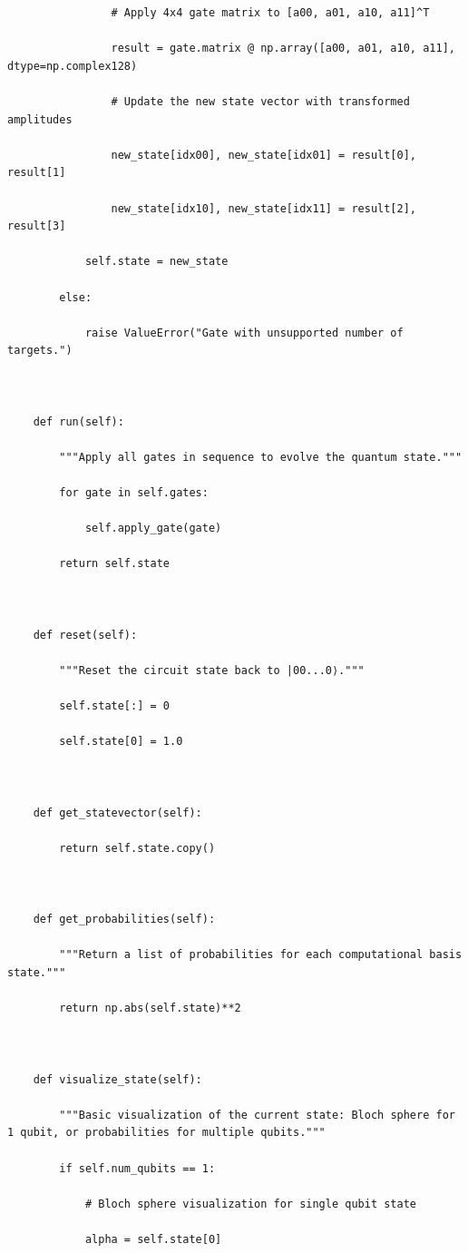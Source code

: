 \documentclass{beamer}
\begin{document}
\begin{frame}
\begin{verbatim}
                # Apply 4x4 gate matrix to [a00, a01, a10, a11]^T

                result = gate.matrix @ np.array([a00, a01, a10, a11], dtype=np.complex128)

                # Update the new state vector with transformed amplitudes

                new_state[idx00], new_state[idx01] = result[0], result[1]

                new_state[idx10], new_state[idx11] = result[2], result[3]

            self.state = new_state

        else:

            raise ValueError("Gate with unsupported number of targets.")



    def run(self):

        """Apply all gates in sequence to evolve the quantum state."""

        for gate in self.gates:

            self.apply_gate(gate)

        return self.state



    def reset(self):

        """Reset the circuit state back to |00...0⟩."""

        self.state[:] = 0

        self.state[0] = 1.0



    def get_statevector(self):

        return self.state.copy()



    def get_probabilities(self):

        """Return a list of probabilities for each computational basis state."""

        return np.abs(self.state)**2



    def visualize_state(self):

        """Basic visualization of the current state: Bloch sphere for 1 qubit, or probabilities for multiple qubits."""

        if self.num_qubits == 1:

            # Bloch sphere visualization for single qubit state

            alpha = self.state[0]


\end{verbatim}
\end{frame}
\end{document}

